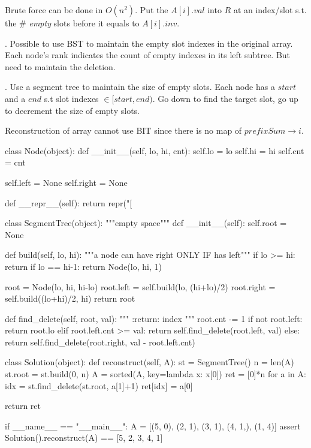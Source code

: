 Brute force can be done in $O(n^2)$. Put the $A[i].val$ into $R$ at an index/slot s.t. the \# \textit{empty} slots before it equals to $A[i].inv$.

. Possible to use BST to maintain the empty slot indexes in the original array. Each node's rank indicates the count of empty indexes in its left subtree. But need to maintain the deletion.  

. Use a segment tree to maintain the size of empty slots. Each node has a $start$ and a $end$ s.t slot indexes $\in [start, end)$. Go down to find the target slot, go up to decrement the size of empty slots. 

Reconstruction of array cannot use BIT since there is no map of $prefixSum \rightarrow i$.
\newpage
\begin{python}
class Node(object):
  def __init__(self, lo, hi, cnt):
    self.lo = lo
    self.hi = hi
    self.cnt = cnt

    self.left = None
    self.right = None

  def __repr__(self):
    return repr("[%


class SegmentTree(object):
  """empty space"""
  def __init__(self):
    self.root = None

  def build(self, lo, hi):
    """a node can have right ONLY IF has left"""
    if lo >= hi: return
    if lo == hi-1: return Node(lo, hi, 1)

    root = Node(lo, hi, hi-lo)
    root.left = self.build(lo, (hi+lo)/2)
    root.right = self.build((lo+hi)/2, hi)
    return root

  def find_delete(self, root, val):
    """
    :return: index
    """
    root.cnt -= 1
    if not root.left:
      return root.lo
    elif root.left.cnt >= val:
      return self.find_delete(root.left, val)
    else:
      return self.find_delete(root.right,
                  val - root.left.cnt)


class Solution(object):
  def reconstruct(self, A):
    st = SegmentTree()
    n = len(A)
    st.root = st.build(0, n)
    A = sorted(A, key=lambda x: x[0])
    ret = [0]*n
    for a in A:
      idx = st.find_delete(st.root, a[1]+1)
      ret[idx] = a[0]

    return ret


if __name__ == "__main__":
  A = [(5, 0), (2, 1), (3, 1), (4, 1,), (1, 4)]
  assert Solution().reconstruct(A) == [5, 2, 3, 4, 1]
\end{python}
